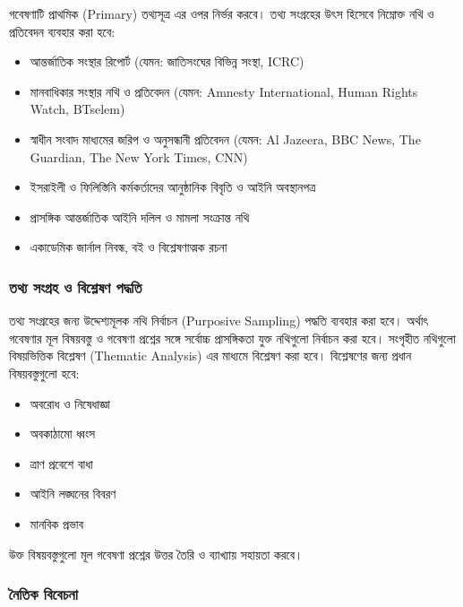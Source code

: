 গবেষণাটি প্রাথমিক (Primary) তথ্যসূত্র এর ওপর নির্ভর করবে। তথ্য সংগ্রহের উৎস হিসেবে নিম্নোক্ত নথি ও প্রতিবেদন ব্যবহার করা হবে:

\begin{itemize}
\item
  আন্তর্জাতিক সংস্থার রিপোর্ট (যেমন: জাতিসংঘের বিভিন্ন সংস্থা, ICRC)
\item
  মানবাধিকার সংস্থার নথি ও প্রতিবেদন (যেমন: Amnesty International, Human Rights Watch, B\textquotesingle Tselem)
\item
  স্বাধীন সংবাদ মাধ্যমের জরিপ ও অনুসন্ধানী প্রতিবেদন (যেমন: Al Jazeera, BBC News, The Guardian, The New York Times, CNN)
\item
  ইসরাইলী ও ফিলিস্তিনি কর্মকর্তাদের আনুষ্ঠানিক বিবৃতি ও আইনি অবস্থানপত্র
\item
  প্রাসঙ্গিক আন্তর্জাতিক আইনি দলিল ও মামলা সংক্রান্ত নথি
\item
  একাডেমিক জার্নাল নিবন্ধ, বই ও বিশ্লেষণাত্মক রচনা
\end{itemize}

\subsubsection{ তথ্য সংগ্রহ ও বিশ্লেষণ পদ্ধতি}\label{ux9a4ux9a5ux9af-ux9b8ux997ux9b0ux9b9-ux993-ux9acux9b6ux9b2ux9b7ux9a3-ux9aaux9a6ux9a7ux9a4}

তথ্য সংগ্রহের জন্য উদ্দেশ্যমূলক নথি নির্বাচন (Purposive Sampling) পদ্ধতি ব্যবহার করা হবে। অর্থাৎ গবেষণার মূল বিষয়বস্তু ও গবেষণা প্রশ্নের সঙ্গে সর্বোচ্চ প্রাসঙ্গিকতা যুক্ত নথিগুলো নির্বাচন করা হবে। সংগৃহীত নথিগুলো বিষয়ভিত্তিক বিশ্লেষণ (Thematic Analysis) এর মাধ্যমে বিশ্লেষণ করা হবে। বিশ্লেষণের জন্য প্রধান বিষয়বস্তুগুলো হবে:

\begin{itemize}
\item
  অবরোধ ও নিষেধাজ্ঞা
\item
  অবকাঠামো ধ্বংস
\item
  ত্রাণ প্রবেশে বাধা
\item
  আইনি লঙ্ঘনের বিবরণ
\item
  মানবিক প্রভাব
\end{itemize}

উক্ত বিষয়বস্তুগুলো মূল গবেষণা প্রশ্নের উত্তর তৈরি ও ব্যাখ্যায় সহায়তা করবে।

\subsubsection{\texorpdfstring{ নৈতিক বিবেচনা }{১.৭.৩ নৈতিক বিবেচনা }}\label{ux9a8ux9a4ux995-ux9acux9acux99aux9a8}

